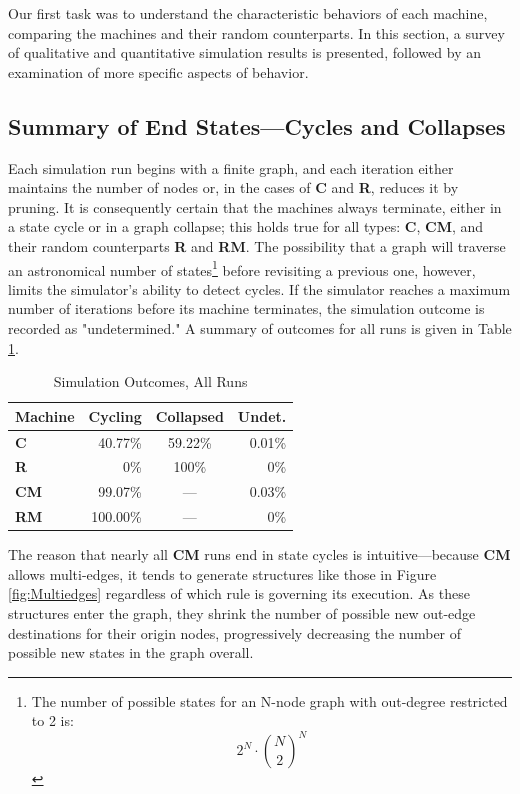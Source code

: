 \documentclass{tufte-handout}
\begin{document}
Our first task was to understand the characteristic behaviors of each
machine, comparing the machines and their random counterparts.
In this section, a survey of qualitative and quantitative simulation results is
presented, followed by an examination of more specific aspects of behavior.

\subsection{Summary of End States---Cycles and Collapses}

Each simulation run begins with a finite graph, and each iteration
either maintains the number of nodes or, in the cases of \textbf{C} and \textbf{R},
reduces it by pruning.  It is consequently certain that the machines always terminate,
either in a state cycle or in a graph collapse; this holds true
for all types: \textbf{C}, \textbf{CM}, and their random counterparts \textbf{R} and \textbf{RM}.
The possibility that a graph will traverse an astronomical number
of states\footnote{The number of possible states for an N-node graph with
out-degree restricted to 2 is:
\[
2^N\cdot\binom{N}{2}^N
\]
}
before revisiting a previous one, however, limits the simulator's ability to
detect cycles. If the simulator reaches a maximum number of iterations
before its machine terminates, the simulation outcome is recorded as "undetermined."
A summary of outcomes for all runs is given in Table \ref{tab:Tab2}.

\begin{table}
\caption{Simulation Outcomes, All Runs}
\centering
\begin{tabular}{lrcr}
\toprule
Machine & Cycling & Collapsed & Undet. \\
\midrule
\textbf{C} & 40.77\% & 59.22\% & 0.01\% \\
\textbf{R} & 0\% & 100\% & 0\% \\
\cmidrule(r){2-4}
\textbf{CM} & 99.07\% & --- & 0.03\% \\
\textbf{RM} & 100.00\% & --- & 0\% \\
\bottomrule
\end{tabular}
\label{tab:Tab2}
\end{table}
\vspace{3mm}

The reason that nearly all \textbf{CM} runs end in state cycles is
intuitive---because \textbf{CM} allows multi-edges, it tends to generate structures
like those in Figure \ref{fig:Multiedges} regardless of which rule is governing its execution.
As these structures enter the graph, they 
shrink the number of possible new out-edge destinations for their origin nodes,
progressively decreasing the number of possible new states in the graph overall.
\end{document}
